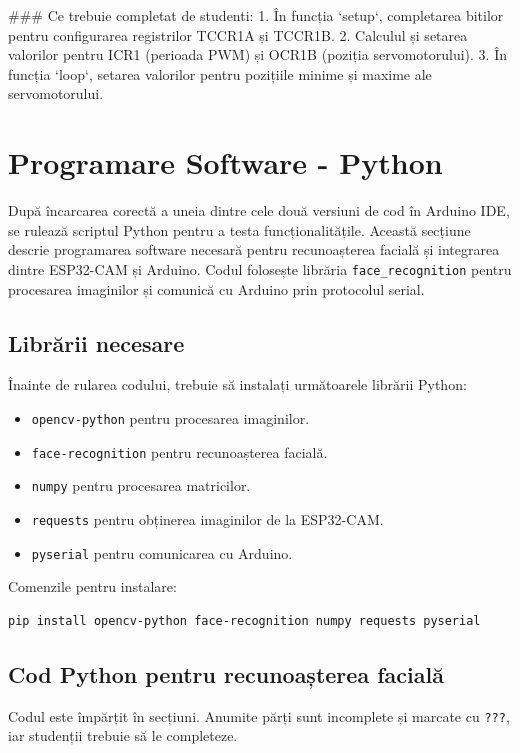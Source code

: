 \documentclass{report}
\begin{document}
### Ce trebuie completat de studenti:
1. În funcția `setup`, completarea bitilor pentru configurarea registrilor TCCR1A și TCCR1B.
2. Calculul și setarea valorilor pentru ICR1 (perioada PWM) și OCR1B (poziția servomotorului).
3. În funcția `loop`, setarea valorilor pentru pozițiile minime și maxime ale servomotorului.

\section{Programare Software - Python}
După încarcarea corectă a uneia dintre cele două versiuni de cod în Arduino IDE, se rulează scriptul Python pentru a testa funcționalitățile.
Această secțiune descrie programarea software necesară pentru recunoașterea facială și integrarea dintre ESP32-CAM și Arduino. Codul folosește librăria \texttt{face\_recognition} pentru procesarea imaginilor și comunică cu Arduino prin protocolul serial.
\newpage
\vspace*{1cm}
\subsection{Librării necesare}
Înainte de rularea codului, trebuie să instalați următoarele librării Python:
\begin{itemize}
    \item \texttt{opencv-python} pentru procesarea imaginilor.
    \item \texttt{face-recognition} pentru recunoașterea facială.
    \item \texttt{numpy} pentru procesarea matricilor.
    \item \texttt{requests} pentru obținerea imaginilor de la ESP32-CAM.
    \item \texttt{pyserial} pentru comunicarea cu Arduino.
\end{itemize}

Comenzile pentru instalare:
\begin{lstlisting}[language=bash]
pip install opencv-python face-recognition numpy requests pyserial
\end{lstlisting}

\subsection{Cod Python pentru recunoașterea facială}
Codul este împărțit în secțiuni. Anumite părți sunt incomplete și marcate cu \texttt{???}, iar studenții trebuie să le completeze.
\end{document}
